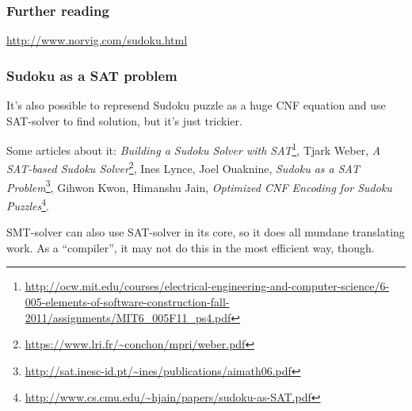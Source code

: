 \subsubsection{Further reading}

\url{http://www.norvig.com/sudoku.html}

\subsubsection{Sudoku as a \ac{SAT} problem}

It's also possible to represend Sudoku puzzle as a huge \ac{CNF} equation and use \ac{SAT}-solver to find solution, but it's just trickier.

Some articles about it:
\textit{Building a Sudoku Solver with SAT}\footnote{\url{http://ocw.mit.edu/courses/electrical-engineering-and-computer-science/6-005-elements-of-software-construction-fall-2011/assignments/MIT6_005F11_ps4.pdf}},
Tjark Weber, \textit{A SAT-based Sudoku Solver}\footnote{\url{https://www.lri.fr/~conchon/mpri/weber.pdf}},
Ines Lynce, Joel Ouaknine, \textit{Sudoku as a SAT Problem}\footnote{\url{http://sat.inesc-id.pt/~ines/publications/aimath06.pdf}},
Gihwon Kwon, Himanshu Jain, \textit{Optimized CNF Encoding for Sudoku Puzzles}\footnote{\url{http://www.cs.cmu.edu/~hjain/papers/sudoku-as-SAT.pdf}}.

\ac{SMT}-solver can also use \ac{SAT}-solver in its core, so it does all mundane translating work.
As a ``compiler'', it may not do this in the most efficient way, though.

